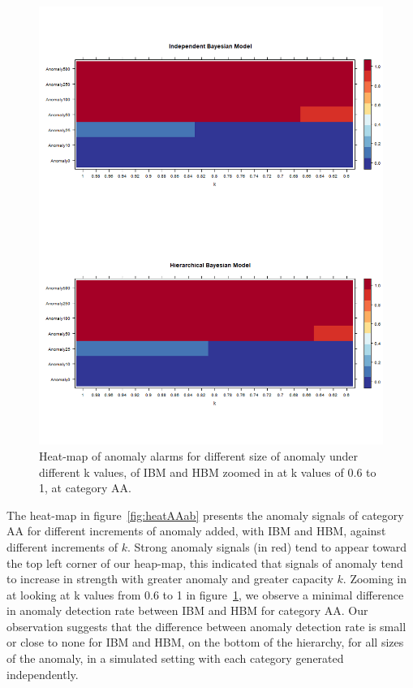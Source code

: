 \begin{figure}[!h]
	\centering
	\includegraphics[width=1\linewidth]{../../R-codes/JAGS/plots/sim1/heatAA2}
	\caption{Heat-map of anomaly alarms for different size of anomaly under different k values, of IBM and HBM zoomed in at k values of 0.6 to 1, at category AA.}
	\label{fig:heatAA2ab}
\end{figure}

\newpage
The heat-map in figure~\ref{fig:heatAAab} presents the anomaly signals of category AA for different increments of anomaly added, with IBM and HBM, against different increments of $k$. Strong anomaly signals (in red) tend to appear toward the top left corner of our heap-map, this indicated that signals of anomaly tend to increase in strength with greater anomaly and greater capacity $k$. Zooming in at looking at k values from 0.6 to 1 in figure~\ref{fig:heatAA2ab}, we observe a minimal difference in anomaly detection rate between IBM and HBM for category AA. Our observation suggests that the difference between anomaly detection rate is small or close to none for IBM and HBM, on the bottom of the hierarchy, for all sizes of the anomaly, in a simulated setting with each category generated independently. 

